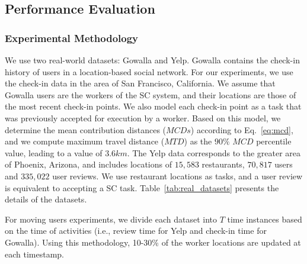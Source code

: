 \documentclass{USC-Thesis}
\numberwithin{equation}{chapter}
\begin{document}
\subsection{Performance Evaluation}
\label{sec:pe}

\subsubsection{Experimental Methodology}
\label{sec:experimental_setup}
We use two real-world datasets: Gowalla and Yelp. Gowalla contains the check-in history of users in a location-based social network. For our experiments, we use the check-in data in the area of San Francisco, California. We assume that Gowalla users are the workers of the SC system, and their locations are those of the most recent check-in points. We also model each check-in point as a task that was previously accepted for execution by a worker. Based on this model, we determine the mean contribution distances ($\mathit{MCDs}$) according to Eq.~\eqref{eq:mcd}, and we compute maximum travel distance ($\mathit{MTD}$) as the $90\%$ $MCD$ percentile value, leading to a value of $3.6km$. 
The Yelp data corresponds to the greater area of Phoenix, Arizona, and includes locations of $15,583$ restaurants, $70,817$ users and $335,022$ user reviews. We use restaurant locations as tasks, and a user review is equivalent to accepting a SC task.
Table~\ref{tab:real_datasets} presents the details of the datasets.

For moving users experiments, we divide each dataset into $T$ time instances based on the time of activities (i.e., review time for Yelp and check-in time for Gowalla). 
Using this methodology, 10-30\% of the worker locations are updated at each timestamp.%
\end{document}
